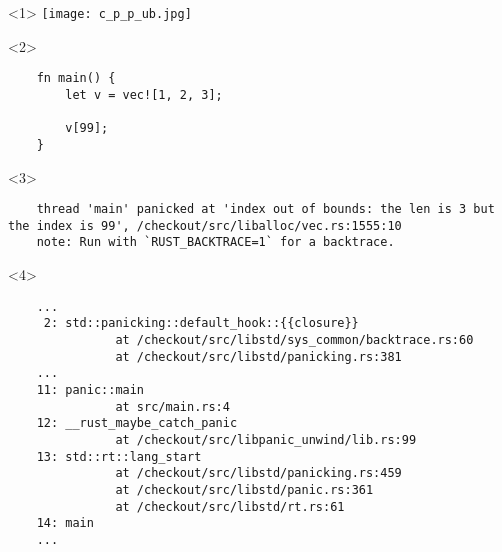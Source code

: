 \begin{frame}[fragile]{\insertsubsubsection}
  \begin{onlyenv}<1>
    \texttt{[image: c\_p\_p\_ub.jpg]}%
  \end{onlyenv}

  \begin{onlyenv}<2>

    \begin{verbatim}
    fn main() {
        let v = vec![1, 2, 3];

        v[99];
    }
  \end{verbatim}

  \end{onlyenv}

  \begin{onlyenv}<3>

    \begin{verbatim}
    thread 'main' panicked at 'index out of bounds: the len is 3 but the index is 99', /checkout/src/liballoc/vec.rs:1555:10
    note: Run with `RUST_BACKTRACE=1` for a backtrace.
  \end{verbatim}

  \end{onlyenv}

  \begin{onlyenv}<4>

    \begin{verbatim}
    ...
     2: std::panicking::default_hook::{{closure}}
               at /checkout/src/libstd/sys_common/backtrace.rs:60
               at /checkout/src/libstd/panicking.rs:381
    ...
    11: panic::main
               at src/main.rs:4
    12: __rust_maybe_catch_panic
               at /checkout/src/libpanic_unwind/lib.rs:99
    13: std::rt::lang_start
               at /checkout/src/libstd/panicking.rs:459
               at /checkout/src/libstd/panic.rs:361
               at /checkout/src/libstd/rt.rs:61
    14: main
    ...
  \end{verbatim}

  \end{onlyenv}

\end{frame}

